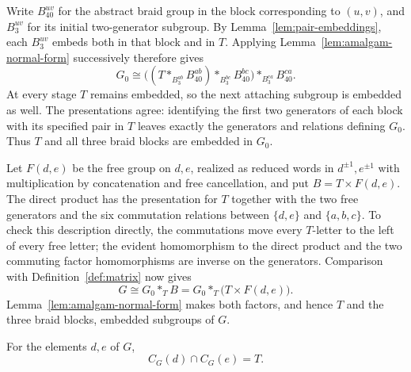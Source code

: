 Write $B_{40}^{uv}$ for the abstract braid group in the block
corresponding to $(u,v)$, and $B_3^{uv}$ for its initial two-generator
subgroup.  By Lemma~\ref{lem:pair-embeddings}, each $B_3^{uv}$ embeds
both in that block and in $T$.  Applying
Lemma~\ref{lem:amalgam-normal-form} successively therefore gives
\begin{equation}\label{eq:iterated-amalgam}
 G_0\cong
 \bigl((T*_{B_3^{ab}}B_{40}^{ab})
       *_{B_3^{bc}}B_{40}^{bc}\bigr)
       *_{B_3^{ca}}B_{40}^{ca}.
\end{equation}
At every stage $T$ remains embedded, so the next attaching subgroup
is embedded as well.  The presentations agree: identifying the
first two generators of each block with its specified pair in $T$
leaves exactly the generators and relations defining $G_0$.
Thus $T$ and all three braid blocks are embedded in $G_0$.

Let $F(d,e)$ be the free group on $d,e$, realized as reduced words
in $d^{\pm1},e^{\pm1}$ with multiplication by concatenation and
free cancellation, and put
$B=T\times F(d,e)$.  The direct product has the presentation for $T$
together with the two free generators and the six commutation
relations between $\{d,e\}$ and $\{a,b,c\}$.  To check this description
directly, the commutations move every $T$-letter to the left of every
free letter; the evident homomorphism to the direct product and
the two commuting factor homomorphisms are inverse on the generators.
Comparison with Definition~\ref{def:matrix} now gives
\begin{equation}\label{eq:full-amalgam}
 G\cong G_0*_T B
       =G_0*_T\bigl(T\times F(d,e)\bigr).
\end{equation}
Lemma~\ref{lem:amalgam-normal-form} makes both factors, and hence
$T$ and the three braid blocks, embedded subgroups of $G$.

\begin{lemma}\label{lem:common-centralizer}
For the elements $d,e$ of $G$,
\[
 C_G(d)\cap C_G(e)=T.
\]
\end{lemma}

